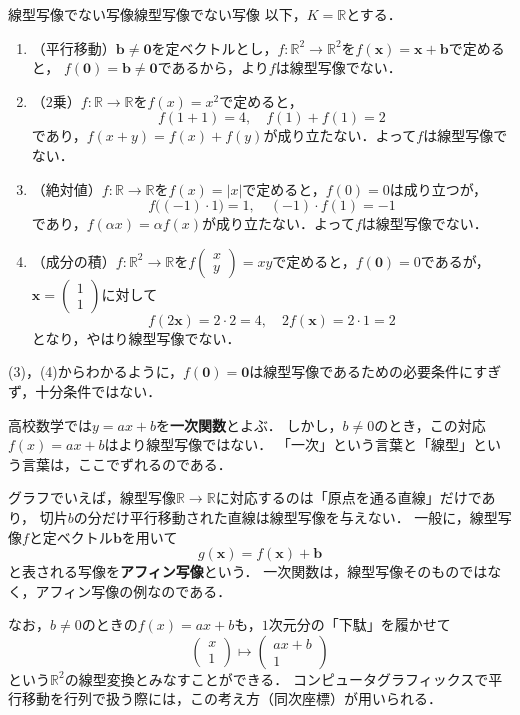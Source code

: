 \begin{example}{線型写像でない写像}{線型写像でない写像}
  以下，$K = \mathbb{R}$とする．
  \begin{enumerate}[label=(\arabic*),leftmargin=3.2em]
    \item （平行移動）$\bm{b} \ne \bm{0}$を定ベクトルとし，$f \colon \mathbb{R}^2 \to \mathbb{R}^2$を$f(\bm{x}) = \bm{x} + \bm{b}$で定めると，
      $f(\bm{0}) = \bm{b} \ne \bm{0}$であるから，より$f$は線型写像でない．
    \item （$2$乗）$f \colon \mathbb{R} \to \mathbb{R}$を$f(x) = x^2$で定めると，
      \[
        f(1 + 1) = 4, \quad f(1) + f(1) = 2
      \]
      であり，$f(x + y) = f(x) + f(y)$が成り立たない．よって$f$は線型写像でない．
    \item （絶対値）$f \colon \mathbb{R} \to \mathbb{R}$を$f(x) = |x|$で定めると，$f(0) = 0$は成り立つが，
      \[
        f\bigl((-1) \cdot 1\bigr) = 1, \quad (-1) \cdot f(1) = -1
      \]
      であり，$f(\alpha x) = \alpha f(x)$が成り立たない．よって$f$は線型写像でない．
    \item （成分の積）$f \colon \mathbb{R}^2 \to \mathbb{R}$を$f\begin{pmatrix} x \\ y \end{pmatrix} = xy$で定めると，$f(\bm{0}) = 0$であるが，
      $\bm{x} = \begin{pmatrix} 1 \\ 1 \end{pmatrix}$に対して
      \[
        f(2\bm{x}) = 2 \cdot 2 = 4, \quad 2 f(\bm{x}) = 2 \cdot 1 = 2
      \]
      となり，やはり線型写像でない．
  \end{enumerate}
  (3)，(4)からわかるように，$f(\bm{0}) = \bm{0}$は線型写像であるための必要条件にすぎず，十分条件ではない．
\end{example}

\begin{mycolumn}
  高校数学では$y = ax + b$を\textbf{一次関数}とよぶ．
  しかし，$b \ne 0$のとき，この対応$f(x) = ax + b$はより線型写像ではない．
  「一次」という言葉と「線型」という言葉は，ここでずれるのである．

  グラフでいえば，線型写像$\mathbb{R} \to \mathbb{R}$に対応するのは「原点を通る直線」だけであり，
  切片$b$の分だけ平行移動された直線は線型写像を与えない．
  一般に，線型写像$f$と定ベクトル$\bm{b}$を用いて
  \[
    g(\bm{x}) = f(\bm{x}) + \bm{b}
  \]
  と表される写像を\textbf{アフィン写像}という．
  一次関数は，線型写像そのものではなく，アフィン写像の例なのである．

  なお，$b \ne 0$のときの$f(x) = ax + b$も，$1$次元分の「下駄」を履かせて
  \[
    \begin{pmatrix} x \\ 1 \end{pmatrix} \longmapsto \begin{pmatrix} ax + b \\ 1 \end{pmatrix}
  \]
  という$\mathbb{R}^2$の線型変換とみなすことができる．
  コンピュータグラフィックスで平行移動を行列で扱う際には，この考え方（同次座標）が用いられる．
\end{mycolumn}

